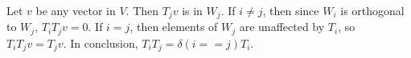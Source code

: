 \documentclass{article}
\begin{document}
\bigskip
\par
\begin{prob}
\end{prob}
Let $v$ be any vector in $V$. Then $T_j v$ is in $W_j$. If $i \neq j$, then since $W_i$ is orthogonal to $W_j$, $T_i T_j v = 0$. If $i = j$, then elements of $W_j$ are unaffected by $T_i$, so $T_i T_j v = T_j v$. In conclusion, $T_i T_j = \delta(i == j) T_i$.


\end{document}
